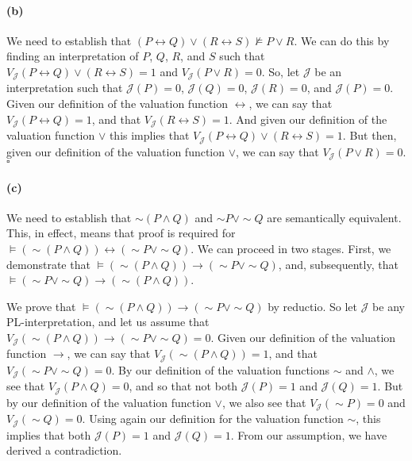 \documentclass[sloppy, journal, git, bytitle]{humapap}
\begin{document}
\paragraph{(b)} We need to establish that $(P\leftrightarrow Q)\vee(R\leftrightarrow S)\nvDash P\vee R$.
We can do this by finding an interpretation of $P$, $Q$, $R$, and $S$ such that 
$V\mathcal{_J}(P\leftrightarrow Q)\vee(R\leftrightarrow S)=1$ and 
$V\mathcal{_J}(P\vee R)=0$. 
So, let $\mathcal{J}$ be an interpretation such that 
$\mathcal{J}(P)=0$, 
$\mathcal{J}(Q)=0$, 
$\mathcal{J}(R)=0$, and 
$\mathcal{J}(P)=0$. 
Given our definition of the valuation function $\leftrightarrow$, we can say that 
$V\mathcal{_J}(P\leftrightarrow Q)=1$, and that 
$V\mathcal{_J}(R\leftrightarrow S)=1$.
And given our definition of the valuation function $\vee$ this implies that 
$V\mathcal{_J}(P\leftrightarrow Q)\vee(R\leftrightarrow S)=1$. 
But then, given our definition of the valuation function $\vee$, we can say that 
$V\mathcal{_J}(P\vee R)=0$. $\square$ 

\paragraph{(c)} We need to establish that $\sim(P\wedge Q)$ and $\sim P\vee\sim Q$ are semantically equivalent. 
This, in effect, means that proof is required for $\vDash (\sim(P\wedge Q))\leftrightarrow(\sim P\vee\sim Q)$. 
We can proceed in two stages. 
First, we demonstrate that $\vDash (\sim(P\wedge Q))\rightarrow(\sim P\vee\sim Q)$, 
and, subsequently, that $\vDash (\sim P\vee\sim Q)\rightarrow(\sim(P\wedge Q))$. 

We prove that $\vDash (\sim(P\wedge Q))\rightarrow(\sim P\vee\sim Q)$ by reductio. 
So let $\mathcal{J}$ be any PL-interpretation, and let us assume that 
$V\mathcal{_J}(\sim(P\wedge Q))\rightarrow(\sim P\vee\sim Q)=0$. 
Given our definition of the valuation function $\rightarrow$, we can say that 
$V\mathcal{_J}(\sim(P\wedge Q))=1$, and that 
$V\mathcal{_J}(\sim P\vee\sim Q)=0$. 
By our definition of the valuation functions $\sim$ and $\wedge$, we see that 
$V\mathcal{_J}(P\wedge Q)=0$, and so that not both $\mathcal{J}(P)=1$ and $\mathcal{J}(Q)=1$.
But by our definition of the valuation function $\vee$, we also see that 
$V\mathcal{_J}(\sim P)=0$ and 
$V\mathcal{_J}(\sim Q)=0$. 
Using again our definition for the valuation function $\sim$, this implies that both 
$\mathcal{J}(P)=1$ and 
$\mathcal{J}(Q)=1$.
From our assumption, we have derived a contradiction. 
\end{document}
